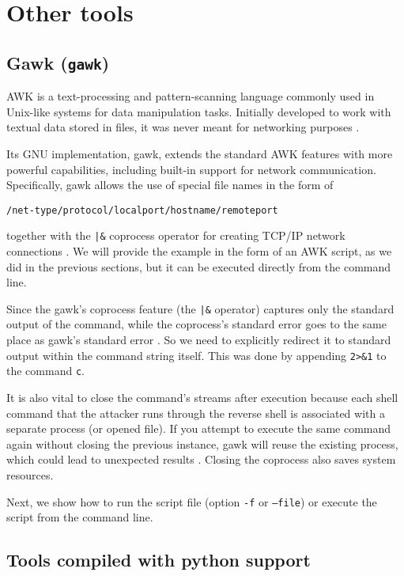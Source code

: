 

\section{Other tools}

\subsection{Gawk (\texttt{gawk})}


AWK is a text-processing and pattern-scanning language commonly used in Unix-like systems for data manipulation tasks. Initially developed to work with textual data stored in files, it was never meant for networking purposes \cite{gawk-doc}.

Its GNU implementation, gawk, extends the standard AWK features with more powerful capabilities, including built-in support for network communication. Specifically, gawk allows the use of special file names in the form of

\qquad \texttt{/net-type/protocol/localport/hostname/remoteport}

together with the \texttt{|\&} coprocess operator for creating TCP/IP network connections \cite{gawk-man}. We will provide the example in the form of an AWK script, as we did in the previous sections, but it can be executed directly from the command line.


Since the gawk's coprocess feature (the \texttt{|\&} operator) captures only the standard output of the command, while the coprocess's standard error goes to the same place as gawk's standard error \cite{gawk-io}. So we need to explicitly redirect it to standard output within the command string itself. This was done by appending \texttt{2>\&1} to the command \texttt{c}.

It is also vital to close the command's streams after execution because each shell command that the attacker runs through the reverse shell is associated with a separate process (or opened file). If you attempt to execute the same command again without closing the previous instance, gawk will reuse the existing process, which could lead to unexpected results \cite{gawk-close}. Closing the coprocess also saves system resources.

Next, we show how to run the script file (option \texttt{-f} or \texttt{--file}) or execute the script from the command line.



\subsection{Tools compiled with python support}


